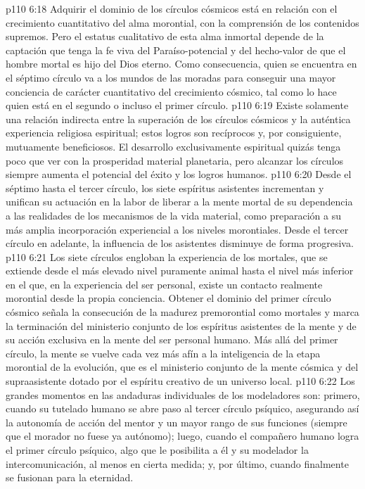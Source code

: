 \vs p110 6:18 Adquirir el dominio de los círculos cósmicos está en relación con el crecimiento cuantitativo del alma morontial, con la comprensión de los contenidos supremos. Pero el estatus cualitativo de esta alma inmortal depende  de la captación que tenga la fe viva del Paraíso\hyp{}potencial y del hecho\hyp{}valor de que el hombre mortal es hijo del Dios eterno. Como consecuencia, quien se encuentra en el séptimo círculo va a los mundos de las moradas para conseguir una mayor conciencia de carácter cuantitativo del crecimiento cósmico, tal como lo hace quien está en el segundo o incluso el primer círculo.
\vs p110 6:19 Existe solamente una relación indirecta entre la superación de los círculos cósmicos y la auténtica experiencia religiosa espiritual; estos logros son recíprocos y, por consiguiente, mutuamente beneficiosos. El desarrollo exclusivamente espiritual quizás tenga poco que ver con la prosperidad material planetaria, pero alcanzar los círculos siempre aumenta el potencial del éxito y los logros humanos.
\vs p110 6:20 Desde el séptimo hasta el tercer círculo, los siete espíritus asistentes incrementan y unifican su actuación en la labor de liberar a la mente mortal de su dependencia a las realidades de los mecanismos de la vida material, como preparación a su más amplia incorporación experiencial a los niveles morontiales. Desde el tercer círculo en adelante, la influencia de los asistentes disminuye de forma progresiva.
\vs p110 6:21 \pc Los siete círculos engloban la experiencia de los mortales, que se extiende desde el más elevado nivel puramente animal hasta el nivel más inferior en el que, en la experiencia del ser personal, existe un contacto realmente morontial desde la propia conciencia. Obtener el dominio del primer círculo cósmico señala la consecución de la madurez premorontial como mortales y marca la terminación del ministerio conjunto de los espíritus asistentes de la mente y de su acción exclusiva en la mente del ser personal humano. Más allá del primer círculo, la mente se vuelve cada vez más afín a la inteligencia de la etapa morontial de la evolución, que es el ministerio conjunto de la mente cósmica y del supraasistente dotado por el espíritu creativo de un universo local.
\vs p110 6:22 Los grandes momentos en las andaduras individuales de los modeladores son: primero, cuando su tutelado humano se abre paso al tercer círculo psíquico, asegurando así la autonomía de acción del mentor y un mayor rango de sus funciones (siempre que el morador no fuese ya autónomo); luego, cuando el compañero humano logra el primer círculo psíquico, algo que le posibilita a él y su modelador la intercomunicación, al menos en cierta medida; y, por último, cuando finalmente se fusionan para la eternidad.

